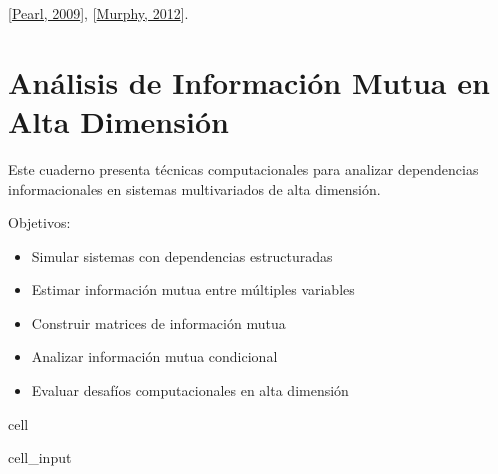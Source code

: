 \documentclass[letterpaper,10pt,english]{jupyterBook}
\begin{document}
\sphinxAtStartPar
{[}\hyperlink{cite.05_appendices/references:id9}{Pearl, 2009}{]}, {[}\hyperlink{cite.05_appendices/references:id5}{Murphy, 2012}{]}.

\sphinxstepscope


\chapter{Análisis de Información Mutua en Alta Dimensión}
\label{\detokenize{03_multivariate_models/high_dimensional:analisis-de-informacion-mutua-en-alta-dimension}}\label{\detokenize{03_multivariate_models/high_dimensional::doc}}
\sphinxAtStartPar
Este cuaderno presenta técnicas computacionales para analizar
dependencias informacionales en sistemas multivariados de alta dimensión.

\sphinxAtStartPar
Objetivos:
\begin{itemize}
\item {} 
\sphinxAtStartPar
Simular sistemas con dependencias estructuradas

\item {} 
\sphinxAtStartPar
Estimar información mutua entre múltiples variables

\item {} 
\sphinxAtStartPar
Construir matrices de información mutua

\item {} 
\sphinxAtStartPar
Analizar información mutua condicional

\item {} 
\sphinxAtStartPar
Evaluar desafíos computacionales en alta dimensión

\end{itemize}

\begin{sphinxuseclass}{cell}\begin{sphinxVerbatimInput}

\begin{sphinxuseclass}{cell_input}
\begin{sphinxVerbatim}[commandchars=\\\{\}]

 
 
\end{sphinxVerbatim}

\end{sphinxuseclass}\end{sphinxVerbatimInput}

\end{sphinxuseclass}
\end{document}
